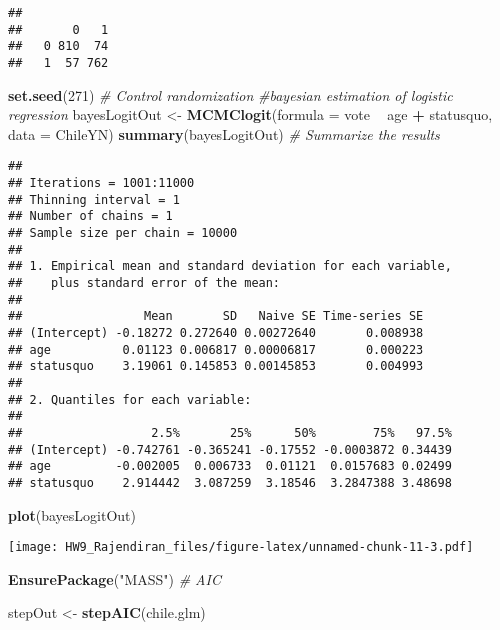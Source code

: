 \documentclass[]{article}
\newenvironment{Shaded}{\begin{snugshade}}{\end{snugshade}}
\newcommand{\CommentTok}[1]{\textcolor[rgb]{0.56,0.35,0.01}{\textit{#1}}}
\newcommand{\DataTypeTok}[1]{\textcolor[rgb]{0.13,0.29,0.53}{#1}}
\newcommand{\DecValTok}[1]{\textcolor[rgb]{0.00,0.00,0.81}{#1}}
\newcommand{\KeywordTok}[1]{\textcolor[rgb]{0.13,0.29,0.53}{\textbf{#1}}}
\newcommand{\NormalTok}[1]{#1}
\newcommand{\OperatorTok}[1]{\textcolor[rgb]{0.81,0.36,0.00}{\textbf{#1}}}
\newcommand{\StringTok}[1]{\textcolor[rgb]{0.31,0.60,0.02}{#1}}
\begin{document}
\begin{verbatim}
##    
##       0   1
##   0 810  74
##   1  57 762
\end{verbatim}

\begin{Shaded}
\begin{Highlighting}[]
\KeywordTok{set.seed}\NormalTok{(}\DecValTok{271}\NormalTok{) }\CommentTok{# Control randomization}
\CommentTok{#bayesian estimation of logistic regression}
\NormalTok{bayesLogitOut <-}\StringTok{ }\KeywordTok{MCMClogit}\NormalTok{(}\DataTypeTok{formula =}\NormalTok{ vote }\OperatorTok{~}\StringTok{ }\NormalTok{age }\OperatorTok{+}\StringTok{ }\NormalTok{statusquo, }\DataTypeTok{data =}\NormalTok{ ChileYN)}
\KeywordTok{summary}\NormalTok{(bayesLogitOut) }\CommentTok{# Summarize the results}
\end{Highlighting}
\end{Shaded}

\begin{verbatim}
## 
## Iterations = 1001:11000
## Thinning interval = 1 
## Number of chains = 1 
## Sample size per chain = 10000 
## 
## 1. Empirical mean and standard deviation for each variable,
##    plus standard error of the mean:
## 
##                 Mean       SD   Naive SE Time-series SE
## (Intercept) -0.18272 0.272640 0.00272640       0.008938
## age          0.01123 0.006817 0.00006817       0.000223
## statusquo    3.19061 0.145853 0.00145853       0.004993
## 
## 2. Quantiles for each variable:
## 
##                  2.5%       25%      50%        75%   97.5%
## (Intercept) -0.742761 -0.365241 -0.17552 -0.0003872 0.34439
## age         -0.002005  0.006733  0.01121  0.0157683 0.02499
## statusquo    2.914442  3.087259  3.18546  3.2847388 3.48698
\end{verbatim}

\begin{Shaded}
\begin{Highlighting}[]
\KeywordTok{plot}\NormalTok{(bayesLogitOut)}
\end{Highlighting}
\end{Shaded}

\texttt{[image: HW9\_Rajendiran\_files/figure-latex/unnamed-chunk-11-3.pdf]}

\begin{Shaded}
\begin{Highlighting}[]
\KeywordTok{EnsurePackage}\NormalTok{(}\StringTok{"MASS"}\NormalTok{) }\CommentTok{# AIC}

\NormalTok{stepOut <-}\StringTok{ }\KeywordTok{stepAIC}\NormalTok{(chile.glm)}
\end{Highlighting}
\end{Shaded}
\end{document}
